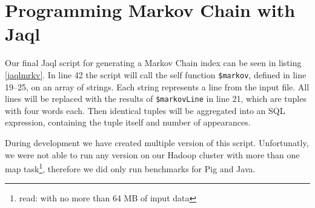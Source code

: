 \section{Programming Markov Chain with Jaql} 


Our final Jaql script for generating a Markov Chain index can be seen in listing \ref{jaqlmrkv}. In line 42 the script will call the self function \lstinline[language=jaql]!$markov!, defined in line 19--25, on an array of strings. Each string represents a line from the input file. All lines will be replaced with the results of \lstinline[language=jaql]!$markovLine! in line 21, which are tuples with four words each. Then identical tuples will be aggregated into an SQL expression, containing the tuple itself and number of appearances.       

During development we have created multiple version of this script. Unfortunatly, we were not able to run any version on our Hadoop cluster with more than one map task\footnote{read: with no more than 64 MB of input data}, therefore we did only run benchmarks for Pig and Java.